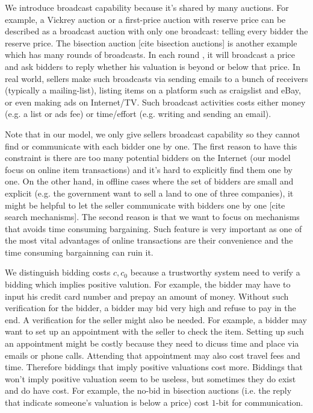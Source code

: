 \documentclass{aamas2012}
\begin{document}
We introduce broadcast capability because it's shared by many auctions.  For
example, a Vickrey auction or a first-price auction with reserve price can be
described as a broadcast auction with only one broadcast: telling every bidder
the reserve price. The bisection auction [cite bisection auctions] is another
example which has many rounds of broadcasts. In each round , it will broadcast
a price and ask bidders to reply whether his valuation is beyond or below that
price.  In real world, sellers make such broadcasts via sending emails to a
bunch of receivers (typically a mailing-list), listing items on a platform such
as craigslist and eBay, or even making ads on Internet/TV. Such broadcast
activities costs either money (e.g. a list or ads fee) or time/effort (e.g.
writing and sending an email).

Note that in our model, we only give sellers broadcast capability so they
cannot find or communicate with each bidder one by one. The first reason to
have this constraint is there are too many potential bidders on the Internet
(our model focus on online item transactions) and it's hard to explicitly find
them one by one. On the other hand, in offline cases where the set of bidders
are small and explicit (e.g. the government want to sell a land to one of three
companies), it might be helpful to let the seller communicate with bidders one
by one [cite search mechanisms]. The second reason is that we want to focus on
mechanisms that avoids time consuming bargaining. Such feature is very
important as one of the most vital advantages of online transactions are their
convenience and the time consuming bargainning can ruin it.

We distinguish bidding costs $c, c_0$ because a trustworthy system need to
verify a bidding which implies positive valution. For example, the bidder may
have to input his credit card number and prepay an amount of money. Without
such verification for the bidder, a bidder may bid very high and refuse to pay
in the end. A verification for the seller might also be needed. For example, a
bidder may want to set up an appointment with the seller to check the item.
Setting up such an appointment might be costly because they need to dicuss time
and place via emails or phone calls.  Attending that appointment may also cost
travel fees and time. Therefore biddings that imply positive valuations cost
more. Biddings that won't imply positive valuation seem to be useless, but
sometimes they do exist and do have cost. For example, the no-bid in bisection
auctions (i.e. the reply that indicate someone's valuation is below a price)
cost $1$-bit for communication.
\end{document}

